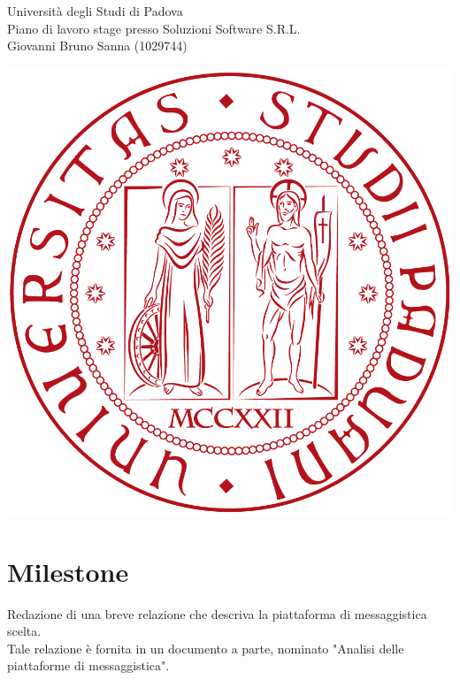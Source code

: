 \documentclass[11pt,notitlepage]{article}
\newcommand{\nomeStudente}{Giovanni Bruno}
\newcommand{\cognomeStudente}{Sanna}
\newcommand{\matricolaStudente}{1029744}
\newcommand{\ragioneSocAzienda}{Soluzioni Software S.R.L.}
\begin{document}
\noindent
\parbox{0.7\columnwidth}{Università degli Studi di Padova\\
	Piano di lavoro stage presso \ragioneSocAzienda{}\\
	\nomeStudente{} \cognomeStudente{} (\matricolaStudente{})}%
\parbox{0.3\columnwidth}{
	\hfill \includegraphics[scale=0.08]{immagini/logo-unipd.png}}

\bigskip
\section*{Milestone}
Redazione di una breve relazione che descriva la piattaforma di messaggistica scelta. \\
Tale relazione è fornita in un documento a parte, nominato "Analisi delle piattaforme di messaggistica".

\bigskip
\end{document}
